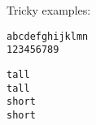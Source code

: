 \documentclass{article}
\begin{document}
Tricky examples:

\begin{verbatim}
abcdefghijklmn
123456789
\end{verbatim}

\begin{verbatim}
tall
tall
short
short
\end{verbatim}
\end{document}
